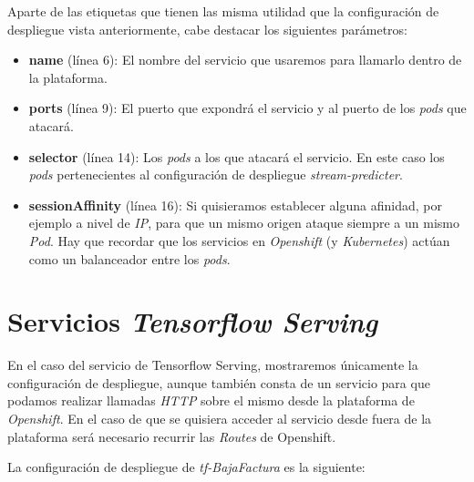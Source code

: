 Aparte de las etiquetas que tienen las misma utilidad que la configuración de despliegue vista anteriormente, cabe destacar los siguientes parámetros: 

\begin{itemize}
	\item \textbf{name} (línea 6): El nombre del servicio que usaremos para llamarlo dentro de la plataforma. 
	 \item \textbf{ports} (línea 9): El puerto que expondrá el servicio y al puerto de los \textit{pods} que atacará. 
	 \item \textbf{selector} (línea 14): Los \textit{pods} a los que atacará el servicio. En este caso los \textit{pods} pertenecientes al configuración de despliegue \textit{stream-predicter}. 
	 
	 \item \textbf{sessionAffinity} (línea 16): Si quisieramos establecer alguna afinidad, por ejemplo a nivel de \textit{IP}, para que un mismo origen ataque siempre a un mismo \textit{Pod}. Hay que recordar que los servicios en \textit{Openshift} (y \textit{Kubernetes}) actúan como un balanceador entre los \textit{pods}.
\end{itemize}




\section{Servicios \textit{Tensorflow Serving}}

En el caso del servicio de Tensorflow Serving, mostraremos únicamente la configuración de despliegue, aunque también consta de un servicio para que podamos realizar llamadas \textit{HTTP} sobre el mismo desde la plataforma de \textit{Openshift}. En el caso de que se quisiera acceder al servicio desde fuera de la plataforma será necesario recurrir las \textit{Routes} de Openshift.

La configuración de despliegue de \textit{tf-BajaFactura} es la siguiente:

